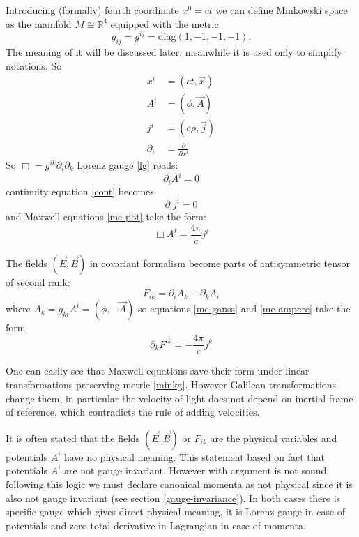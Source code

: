 Introducing (formally) fourth coordinate $ x^0=c t $ we can define
 Minkowski space as  the manifold $M \cong \mathbb{R}^4$ 
equipped with the  metric
\begin{equation}
   \label {minkg}
    g_{i j} = g^{i j}=\mathrm{diag}(1,-1,-1,-1).
\end{equation} 
The meaning of it will be discussed later, meanwhile
it is used only to simplify notations. So
\begin{align}
    x^i&=(ct,\vec x) \label{x4} \\
    A^i&=(\phi,\vec A) \label{a4}\\
    j^i&=(c \rho, \vec j) \label{j4}\\
    \partial_i&= \frac{\partial}{\partial x^i} \label{d4}
\end{align}
So $ \Box=g^{i k} \partial_i \partial_k $ 
Lorenz gauge \eqref{lg} reads:
\begin{equation}
   \label {lgc}
   \partial_i A^i=0
\end{equation} 
 continuity equation \eqref{cont} becomes
\begin{equation}
   \label {contc}
   \partial_i j^i=0
\end{equation} 
and Maxwell equations \eqref{me-pot} take the form:
\begin{equation}
   \label {me-potc}
    \Box A^i= \frac{4 \pi}{c} j^i
\end{equation}

The fields $ (\vec E,\vec B) $ in covariant formalism
become parts of antisymmetric tensor of second rank:
\begin{equation}
   \label {ebc}
    F_{i k}=\partial_i A_k-\partial_k A_i
\end{equation}
where $ A_k=g_{k i} A^i=(\phi,-\vec A) $ so equations \eqref{me-gauss}
and \eqref{me-ampere} take the form
\begin{equation}
   \label {mec}
    \partial_k F^{i k}=-\frac{4 \pi}{c} j^k
\end{equation}

One can easily see that Maxwell equations save their form
under linear transformations preserving metric \eqref{minkg}.
However Galilean transformations change them, in particular
the velocity of light does not depend on inertial frame of
reference, which contradicts the rule of adding velocities.


It is often stated that the fields $ (\vec E,\vec B) $ or
$ F_{i k} $ are the physical variables and potentials
$A^i$ have no physical meaning. This statement based
on fact that potentials $ A^i $ are not gauge invariant.
However with argument is not sound, following this logic
we must declare canonical momenta as not physical since
it  is also not gauge invariant (see section \ref{gauge-invariance}).
In both cases there is specific gauge which gives direct physical
meaning, it is Lorenz gauge in case of potentials and
zero total derivative in Lagrangian in case of momenta.

